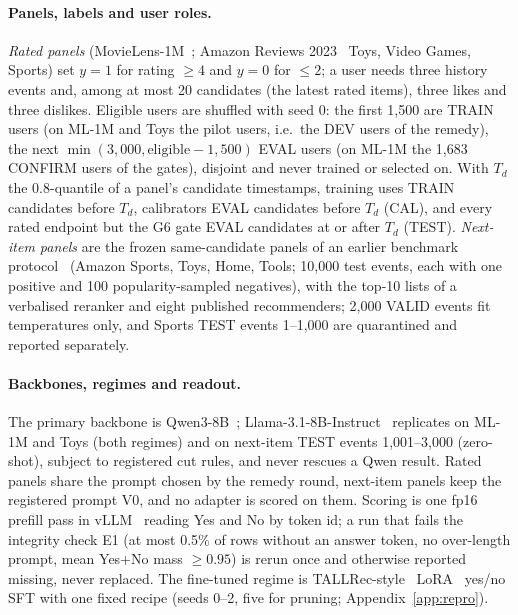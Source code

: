 \paragraph{Panels, labels and user roles.}
\emph{Rated panels} (MovieLens-1M~\citep{harper2015movielens}; Amazon Reviews 2023~\citep{hou2024bridging} Toys, Video Games,
Sports) set $y=1$ for rating $\ge4$ and $y=0$ for $\le2$; a user needs three history events and, among at most 20 candidates (the
latest rated items), three likes and three dislikes. Eligible users are shuffled with seed 0: the first 1,500 are TRAIN users (on
ML-1M and Toys the pilot users, i.e.\ the DEV users of the remedy), the next $\min(3{,}000,\text{eligible}-1{,}500)$ EVAL users
(on ML-1M the 1,683 CONFIRM users of the gates), disjoint and never trained or selected on. With $T_d$ the 0.8-quantile of a panel's
candidate timestamps, training uses TRAIN candidates before $T_d$, calibrators EVAL candidates before $T_d$ (CAL), and every rated
endpoint but the G6 gate EVAL candidates at or after $T_d$ (TEST). \emph{Next-item panels} are the frozen same-candidate panels of an
earlier benchmark protocol~\citep{anon2026benchmark} (Amazon Sports, Toys, Home, Tools; 10,000 test events, each with one positive and
100 popularity-sampled negatives), with the top-10 lists of a verbalised reranker and eight published recommenders; 2,000 VALID events
fit temperatures only, and Sports TEST events 1--1,000 are quarantined and reported separately.

\paragraph{Backbones, regimes and readout.}
The primary backbone is Qwen3-8B~\citep{yang2025qwen3}; Llama-3.1-8B-Instruct~\citep{grattafiori2024llama3} replicates on ML-1M and
Toys (both regimes) and on next-item TEST events 1,001--3,000 (zero-shot), subject to registered cut rules, and never rescues a Qwen
result. Rated panels share the prompt chosen by the remedy round, next-item panels keep the registered prompt V0, and no adapter is
scored on them. Scoring is one fp16 prefill pass in vLLM~\citep{kwon2023vllm} reading Yes and No by token id; a run that fails the
integrity check E1 (at most 0.5\% of rows without an answer token, no over-length prompt, mean Yes+No mass $\ge0.95$) is rerun once
and otherwise reported missing, never replaced. The fine-tuned regime is TALLRec-style~\citep{bao2023tallrec}
LoRA~\citep{hu2022lora} yes/no SFT with one fixed recipe (seeds 0--2, five for pruning; Appendix~\ref{app:repro}).

